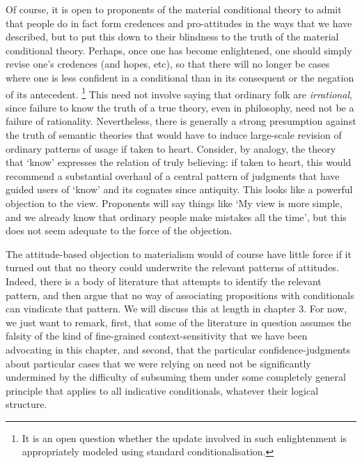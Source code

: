 \documentclass[If.tex]{subfiles}
\begin{document}
\begin{prop}
Of course, it is open to proponents of the material conditional theory to admit that people do in fact form credences and pro-attitudes in the ways that we have described, but to put this down to their blindness to the truth of the material conditional theory.  Perhaps, once one has become enlightened, one should simply revise one's credences (and hopes, etc), so that there will no longer be cases where one is less confident in a conditional than in its consequent or the negation of its antecedent.%
\footnote{It is an open question whether the update involved in such enlightenment is appropriately modeled using standard conditionalisation.}  
This need not involve saying that ordinary folk are \emph{irrational}, since failure to know the truth of a true theory, even in philosophy, need not be a failure of rationality.  Nevertheless, there is generally a strong presumption against the truth of semantic theories that would have to induce large-scale revision of ordinary patterns of usage if taken to heart.  Consider, by analogy, the theory that ‘know’ expresses the relation of truly believing: if taken to heart, this would recommend a substantial overhaul of a central pattern of judgments that have guided users of ‘know’ and its cognates since antiquity.  This looks like a powerful objection to the view.  Proponents will say things like ‘My view is more simple, and we already know that ordinary people make mistakes all the time’, but this does not seem adequate to the force of the objection.

The attitude-based objection to materialism would of course have little force if it turned out that no theory could underwrite the relevant patterns of attitudes. Indeed, there is a body of literature that attempts to identify the relevant pattern, and then argue that no way of associating propositions with conditionals can vindicate that pattern.  We will discuss this at length in chapter 3.  For now, we just want to remark, first, that some of the literature in question assumes the falsity of the kind of fine-grained context-sensitivity that we have been advocating in this chapter, and second, that the particular confidence-judgments about particular cases that we were relying on need not be significantly undermined by the difficulty of subsuming them under some completely general principle that applies to all indicative conditionals, whatever their logical structure.  




\end{prop}
\end{document}
